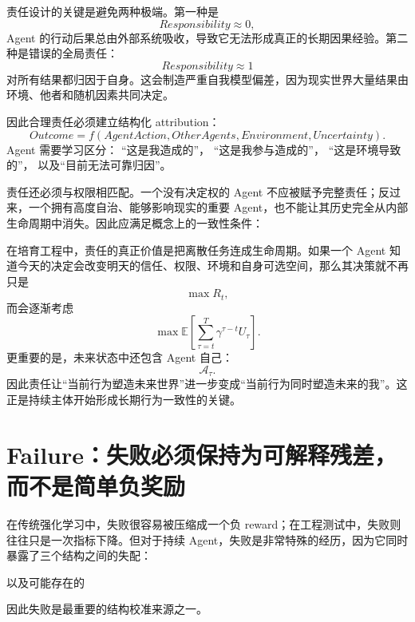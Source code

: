 责任设计的关键是避免两种极端。第一种是
\[
Responsibility\approx0,
\]
Agent 的行动后果总由外部系统吸收，导致它无法形成真正的长期因果经验。第二种是错误的全局责任：
\[
Responsibility\approx1
\]
对所有结果都归因于自身。这会制造严重自我模型偏差，因为现实世界大量结果由环境、他者和随机因素共同决定。

因此合理责任必须建立结构化 attribution：
\[
Outcome
=
f
(
AgentAction,
OtherAgents,
Environment,
Uncertainty
).
\]
Agent 需要学习区分：
“这是我造成的”，
“这是我参与造成的”，
“这是环境导致的”，
以及“目前无法可靠归因”。

责任还必须与权限相匹配。一个没有决定权的 Agent 不应被赋予完整责任；反过来，一个拥有高度自治、能够影响现实的重要 Agent，也不能让其历史完全从内部生命周期中消失。因此应满足概念上的一致性条件：
\begin{statementbox}
\centering
{}
\end{statementbox}

在培育工程中，责任的真正价值是把离散任务连成生命周期。如果一个 Agent 知道今天的决定会改变明天的信任、权限、环境和自身可选空间，那么其决策就不再只是
\[
\max R_t,
\]
而会逐渐考虑
\[
\max
\mathbb E
\left[
\sum_{\tau=t}^{T}
\gamma^{\tau-t}
U_\tau
\right].
\]
更重要的是，未来状态中还包含 Agent 自己：
\[
\mathcal A_{\tau}.
\]
因此责任让“当前行为塑造未来世界”进一步变成“当前行为同时塑造未来的我”。这正是持续主体开始形成长期行为一致性的关键。

\section{Failure：失败必须保持为可解释残差，而不是简单负奖励}

在传统强化学习中，失败很容易被压缩成一个负 reward；在工程测试中，失败则往往只是一次指标下降。但对于持续 Agent，失败是非常特殊的经历，因为它同时暴露了三个结构之间的失配：
\begin{statementbox}
\centering
{}
\end{statementbox}
\begin{statementbox}
\centering
{}
\end{statementbox}
以及可能存在的
\begin{statementbox}
\centering
{}
\end{statementbox}
因此失败是最重要的结构校准来源之一。


